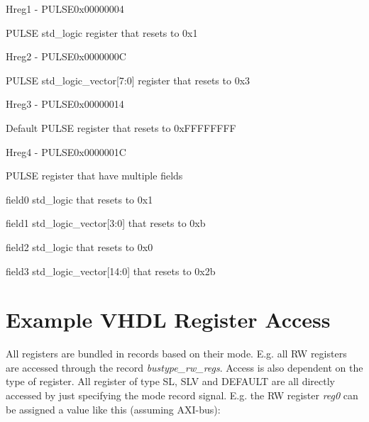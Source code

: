 \documentclass{article}
\begin{document}
\begin{register}{H}{reg1 - PULSE}{0x00000004}
  \par PULSE std{\_}logic register that resets to 0x1 \regnewline
  \label{reg1}
\regnewline
\end{register}

\begin{register}{H}{reg2 - PULSE}{0x0000000C}
  \par PULSE std{\_}logic{\_}vector[7:0] register that resets to 0x3 \regnewline
  \label{reg2}
\regnewline
\end{register}

\begin{register}{H}{reg3 - PULSE}{0x00000014}
  \par Default PULSE register that resets to 0xFFFFFFFF \regnewline
  \label{reg3}
\regnewline
\end{register}

\begin{register}{H}{reg4 - PULSE}{0x0000001C}
  \par PULSE register that have multiple fields \regnewline
  \label{reg4}
\regnewline
  \begin{regdesc}\begin{reglist}[field0]
    \item [field0] std{\_}logic that resets to 0x1    \item [field1] std{\_}logic{\_}vector[3:0] that resets to 0xb    \item [field2] std{\_}logic that resets to 0x0    \item [field3] std{\_}logic{\_}vector[14:0] that resets to 0x2b  \end{reglist}\end{regdesc}
\end{register}

\section{Example VHDL Register Access}

\par
All registers are bundled in records based on their mode. E.g. all RW registers are accessed through the record \textit{bustype\_rw\_regs}. Access is also dependent on the type of register. All register of type SL, SLV and DEFAULT are all directly accessed by just specifying the mode record signal. E.g. the RW register \textit{reg0} can be assigned a value like this (assuming AXI-bus):
\end{document}

